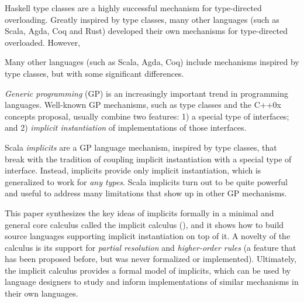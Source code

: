 Haskell type classes are a highly successful mechanism for
type-directed overloading. Greatly inspired by type classes, 
many other languages (such as Scala, Agda,
Coq and Rust) developed their own mechanisms 
for type-directed overloaded. However, 

Many other languages (such as Scala, Agda,
Coq) include mechanisms inspired by type classes, but
with some significant differences.

\emph{Generic programming} (GP) is an increasingly important trend in
programming languages. Well-known GP mechanisms, such as type classes
and the C++0x concepts proposal, usually combine two features: 1) a special type of
interfaces; and 2) \emph{implicit instantiation} of implementations of
those interfaces.

Scala \emph{implicits} are a GP language mechanism, inspired by type
classes, that break with the tradition of coupling
implicit instantiation with a special type of interface. Instead,
implicits provide only implicit instantiation, which is generalized to
work for \emph{any types}. 
Scala implicits turn out to be quite
powerful and useful to address many limitations that show up in other
GP mechanisms.

This paper synthesizes the key ideas of implicits formally in a minimal
and general core calculus called the implicit calculus (\name),
and it shows how to build source languages supporting implicit
instantiation on top of it. A novelty of the calculus is its support
for \emph{partial resolution} and \emph{higher-order rules} (a feature 
that has been proposed before, but was never formalized or implemented).
Ultimately, the implicit calculus provides a formal model of implicits, 
which can be used by language designers to 
study and inform implementations of similar mechanisms in their own languages.





